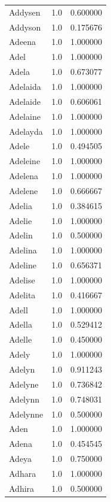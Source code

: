 \documentclass[
  letterpaper,
  DIV=11,
  numbers=noendperiod]{scrreprt}
\begin{document}
\begin{tabular}{lrr}
Addysen         &   1.0 &   0.600000 \\
Addyson         &   1.0 &   0.175676 \\
Adeena          &   1.0 &   1.000000 \\
Adel            &   1.0 &   1.000000 \\
Adela           &   1.0 &   0.673077 \\
Adelaida        &   1.0 &   1.000000 \\
Adelaide        &   1.0 &   0.606061 \\
Adelaine        &   1.0 &   1.000000 \\
Adelayda        &   1.0 &   1.000000 \\
Adele           &   1.0 &   0.494505 \\
Adeleine        &   1.0 &   1.000000 \\
Adelena         &   1.0 &   1.000000 \\
Adelene         &   1.0 &   0.666667 \\
Adelia          &   1.0 &   0.384615 \\
Adelie          &   1.0 &   1.000000 \\
Adelin          &   1.0 &   0.500000 \\
Adelina         &   1.0 &   1.000000 \\
Adeline         &   1.0 &   0.656371 \\
Adelise         &   1.0 &   1.000000 \\
Adelita         &   1.0 &   0.416667 \\
Adell           &   1.0 &   1.000000 \\
Adella          &   1.0 &   0.529412 \\
Adelle          &   1.0 &   0.450000 \\
Adely           &   1.0 &   1.000000 \\
Adelyn          &   1.0 &   0.911243 \\
Adelyne         &   1.0 &   0.736842 \\
Adelynn         &   1.0 &   0.748031 \\
Adelynne        &   1.0 &   0.500000 \\
Aden            &   1.0 &   1.000000 \\
Adena           &   1.0 &   0.454545 \\
Adeya           &   1.0 &   0.750000 \\
Adhara          &   1.0 &   1.000000 \\
Adhira          &   1.0 &   0.500000 \\

\end{tabular}
\end{document}
